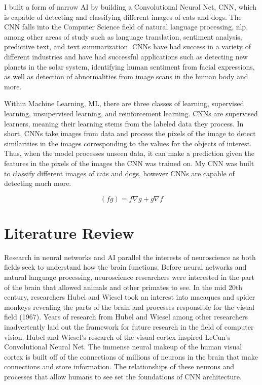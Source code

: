 \documentclass[12pt,english]{article}
\begin{document}
I built a form of narrow AI by building a Convolutional Neural Net, CNN, which is capable of detecting and classifying different images of cats and dogs. The CNN falls into the Computer Science field of natural language processing, nlp, among other areas of study such as language translation, sentiment analysis, predictive text, and text summarization. CNNs have had success in a variety of different industries and have had successful applications such as detecting new planets in the solar system, identifying human sentiment from facial expressions, as well as detection of abnormalities from image scans in the human body and more.\par

Within Machine Learning, ML, there are three classes of learning, supervised learning, unsupervised learning, and reinforcement learning. CNNs are supervised learners, meaning their learning stems from the labeled data they process. In short, CNNs take images from data and process the pixels of the image to detect similarities in the images corresponding to the values for the objects of interest. Thus, when the model processes unseen data, it can make a prediction given the features in the pixels of the images the CNN was trained on. My CNN was built to classify different images of cats and dogs, however CNNs are capable of detecting much more.





\begin{equation}
(fg)= f\nabla g + g \nabla f
\end{equation}



\section{Literature Review}
Research in neural networks and AI parallel the interests of neuroscience as both fields seek to understand how the brain functions. Before neural networks and natural language processing, neuroscience researchers were interested in the part of the brain that allowed animals and other primates to see. In the mid 20th century, researchers Hubel and Wiesel took an interest into macaques and spider monkeys revealing the parts of the brain and processes responsible for the visual field (1967). Years of research from Hubel and Wiesel among other researchers inadvertently laid out the framework for future research in the field of computer vision. 
Hubel and Wiesel’s research of the visual cortex inspired LeCun’s Convolutional Neural Net. The immense neural makeup of the human visual cortex is built off of the connections of millions of neurons in the brain that make connections and store information. The relationships of these neurons and processes that allow humans to see set the foundations of CNN architecture. \par
\end{document}
